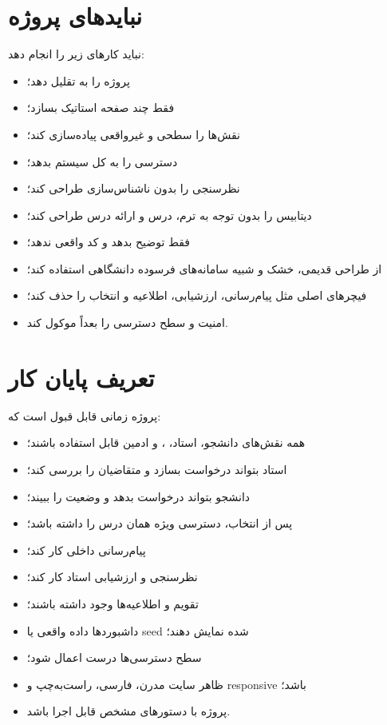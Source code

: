 \documentclass[12pt,a4paper]{article}
\begin{document}
\section{نبایدهای پروژه}
 نباید کارهای زیر را انجام دهد:
\begin{itemize}
\item پروژه را به  تقلیل دهد؛
\item فقط چند صفحه استاتیک بسازد؛
\item نقش‌ها را سطحی و غیرواقعی پیاده‌سازی کند؛
\item دسترسی  را به کل سیستم بدهد؛
\item نظرسنجی را بدون ناشناس‌سازی طراحی کند؛
\item دیتابیس را بدون توجه به ترم، درس و ارائه درس طراحی کند؛
\item فقط توضیح بدهد و کد واقعی ندهد؛
\item از طراحی قدیمی، خشک و شبیه سامانه‌های فرسوده دانشگاهی استفاده کند؛
\item فیچرهای اصلی مثل پیام‌رسانی، ارزشیابی، اطلاعیه و انتخاب  را حذف کند؛
\item امنیت و سطح دسترسی را بعداً موکول کند.
\end{itemize}

\section{تعریف پایان کار}
پروژه زمانی قابل قبول است که:
\begin{itemize}
\item همه نقش‌های دانشجو، استاد، ،  و ادمین قابل استفاده باشند؛
\item استاد بتواند درخواست  بسازد و متقاضیان را بررسی کند؛
\item دانشجو بتواند درخواست بدهد و وضعیت را ببیند؛
\item {} پس از انتخاب، دسترسی ویژه همان درس را داشته باشد؛
\item پیام‌رسانی داخلی کار کند؛
\item نظرسنجی  و ارزشیابی استاد کار کند؛
\item تقویم و اطلاعیه‌ها وجود داشته باشند؛
\item داشبوردها داده واقعی یا seed شده نمایش دهند؛
\item سطح دسترسی‌ها درست اعمال شود؛
\item ظاهر سایت مدرن، فارسی، راست‌به‌چپ و responsive باشد؛
\item پروژه با دستورهای مشخص قابل اجرا باشد.
\end{itemize}
\end{document}
